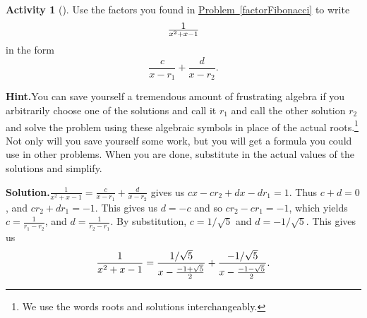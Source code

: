 \documentclass[10pt,]{book}
\theoremstyle{plain}
\theoremstyle{definition}
\newtheorem{activity}[project]{Activity}
\numberwithin{equation}{chapter}
\begin{document}
\begin{activity}[]\label{fractionFibonacci}
Use the factors you found in \hyperref[factorFibonacci]{Problem~\ref{factorFibonacci}} to write%
\begin{equation*}
1\over x^2+x-1
\end{equation*}
in the form%
\begin{equation*}
\frac{c}{x-r_1} + \frac{d}{x-r_2}.
\end{equation*}
%
\par\medskip\noindent%
\textbf{Hint.}\quad You can save yourself a tremendous amount of frustrating algebra if you arbitrarily choose one of the solutions and call it \(r_1\) and call the other solution \(r_2\) and solve the problem using these algebraic symbols in place of the actual roots.\footnote{We use the words roots and solutions interchangeably.\label{fn-14}} Not only will you save yourself some work, but you will get a formula you could use in other problems. When you are done, substitute in the actual values of the solutions and simplify.%
\par\medskip\noindent%
\textbf{Solution.}\quad \(\frac{1}{x^2+x-1}=\frac{c}{x-r_1}+\frac{d}{x-r_2}\) gives us \(cx-cr_2+dx-dr_1=1\). Thus \(c+d=0\), and \(cr_2+dr_1 =-1\). This gives us \(d=-c\) and so \(cr_2-cr_1=-1\), which yields \(c=\frac{1}{r_1-r_2}\), and \(d=\frac{1}{r_2-r_1}\). By substitution, \(c=1/\sqrt{5}\) and \(d=-1/\sqrt{5}\). This gives us%
\begin{equation*}
\frac{1}{x^2+x-1} = {1/\sqrt{5}\over x-{-1+\sqrt{5}\over2}}
+{-1/\sqrt{5}\over x- {-1-\sqrt{5}\over2}}.
\end{equation*}
%
\end{activity}
\end{document}
